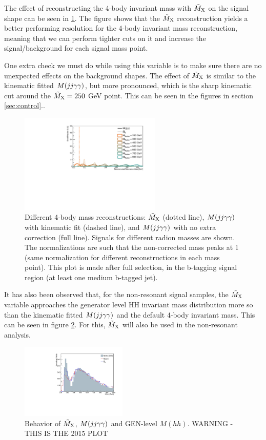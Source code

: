 The effect of reconstructing the 4-body invariant mass with $\tilde{M}_{\mathrm{X}}$ on the signal shape can be seen in \ref{fig:mx}. 
The figure shows that the $\tilde{M}_{\mathrm{X}}$ reconstruction yields a better performing resolution for the 4-body invariant mass reconstruction, meaning that we can perform tighter cuts on it and increase the signal/background for each signal mass point.

One extra check we must do while using this variable is to make sure there are no unexpected effects on the background shapes. 
The effect of $\tilde{M}_{\mathrm{X}}$ is similar to the kinematic fitted $M(jj\gamma\gamma)$, but more pronounced, which is the sharp kinematic cut around the $\tilde{M}_{\mathrm{X}} = 250$ GeV point. This can be seen in the figures in section \ref{sec:control}..

\begin{figure}[thb]
  \centering
  \includegraphics[width=0.6\textwidth]{figures/sec-window/prplot.pdf}\hfil
  \caption{Different 4-body mass reconstructions: $\tilde{M}_{\mathrm{X}}$ (dotted line), $M(jj\gamma\gamma)$ with kinematic fit (dashed line), and $M(jj\gamma\gamma)$ with no extra correction (full line). Signals for different radion masses are shown. The normalizations are such that the non-corrected mass peaks at 1 (same normalization for different reconstructions in each mass point). This plot is made after full selection, in the b-tagging signal region (at least one medium b-tagged jet).}
  \label{fig:mx}
\end{figure}

It has also been observed that, for the non-resonant signal samples, the $\tilde{M}_{\mathrm{X}}$ variable approaches the generator level HH invariant mass distribution more so than the kinematic fitted $M(jj\gamma\gamma)$ and the default 4-body invariant mass. This can be seen in figure \ref{fig:mxnonres}. For this, $\tilde{M}_{\mathrm{X}}$ will also be used in the non-resonant analysis.

\begin{figure}[thb]
  \centering
  \includegraphics[width=0.45\textwidth]{figures/sec-window/nonresmx.pdf}\hfil
  \caption{Behavior of $\tilde{M}_{\mathrm{X}}$, $M(jj\gamma\gamma)$ and GEN-level $M(hh)$. WARNING - THIS IS THE 2015 PLOT}
  \label{fig:mxnonres}
\end{figure}

